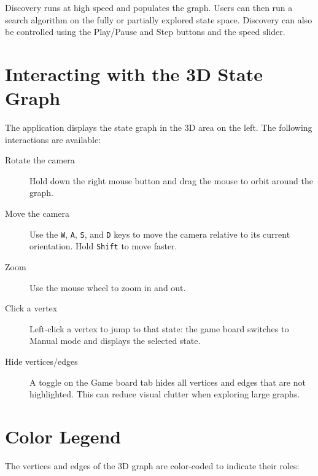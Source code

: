 Discovery runs at high speed and populates the graph. Users can then run a search algorithm on the fully or partially explored state space. Discovery can also be controlled using the Play/Pause and Step buttons and the speed slider.

\section{Interacting with the 3D State Graph}

The application displays the state graph in the 3D area on the left. The following interactions are available:

\begin{description}
    \item[Rotate the camera] Hold down the right mouse button and drag the mouse to orbit around the graph.
    \item[Move the camera] Use the \texttt{W}, \texttt{A}, \texttt{S}, and \texttt{D} keys to move the camera relative to its current orientation. Hold \texttt{Shift} to move faster.
    \item[Zoom] Use the mouse wheel to zoom in and out.
    \item[Click a vertex] Left-click a vertex to jump to that state: the game board switches to Manual mode and displays the selected state.
    \item[Hide vertices/edges] A toggle on the Game board tab hides all vertices and edges that are not highlighted. This can reduce visual clutter when exploring large graphs.
\end{description}

\section{Color Legend}
\label{sec:color-legend}

The vertices and edges of the 3D graph are color-coded to indicate their roles:

